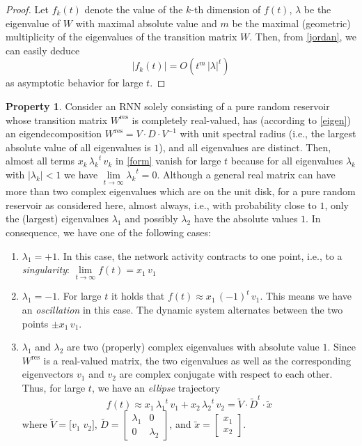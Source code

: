 \documentclass[twoside,11pt]{article}
\theoremstyle{definition}
\newtheorem{prop}{Property}
\begin{document}
\begin{proof}
Let $f_k(t)$ denote the value of the $k$-th dimension of $f(t)$, $\lambda$ be
the eigenvalue of $W$ with maximal absolute value and $m$ be the maximal (geometric)
multiplicity of the eigenvalues of the transition matrix $W$. Then, from
\cref{jordan}, we can easily deduce \[ |f_k(t)| = O(t^m\,|\lambda|^t) \]
as asymptotic behavior for large $t$.
\end{proof}

\begin{prop}\label{infty}
Consider an RNN solely consisting of a pure random reservoir whose transition
matrix $W^\mathrm{res}$ is completely real-valued, has (according to
\cref{eigen}) an eigendecomposition $W^\mathrm{res} = V \cdot D \cdot
V^{-1}$ with unit spectral radius (i.e., the largest absolute value of all
eigenvalues is $1$), and all eigenvalues are distinct. Then, almost all terms $x_k\,{\lambda_k}^t\,v_k$ in
\cref{form} vanish for large $t$ because for all eigenvalues $\lambda_k$
with $|\lambda_k| < 1$ we have $\lim\limits_{t \to \infty} {\lambda_k}^t = 0$.
Although a general real matrix can have more than two complex eigenvalues which
are on the unit disk, for a pure random reservoir as considered here, almost
always, i.e., with probability close to $1$, only the (largest) eigenvalues $\lambda_1$ and possibly
$\lambda_2$ have the absolute values $1$. In consequence, we have one of the
following cases:
\begin{enumerate}
  \item $\lambda_1 = +1$. In this case, the network activity contracts to one
	point, i.e., to a \emph{singularity}: $\lim\limits_{t \to \infty}
	f(t) = x_1\,v_1$
  \item $\lambda_1 = -1$. For large $t$ it holds that $f(t) \approx
	x_1\,(-1)^t\,v_1$. This means we have an \emph{oscillation} in this
	case. The dynamic system alternates between the two points $\pm x_1\,v_1$.
  \item $\lambda_1$ and $\lambda_2$ are two (properly) complex eigenvalues with
	absolute value $1$. Since $W^\mathrm{res}$ is a real-valued matrix, the two
	eigenvalues as well as the corresponding eigenvectors $v_1$ and $v_2$
	are complex conjugate with respect to each other. Thus, for large $t$, we
	have an \emph{ellipse} trajectory
	\[
		f(t) \approx x_1\,{\lambda_1}^t\,v_1 + x_2\,{\lambda_2}^t\,v_2
		= \tilde{V} \cdot \tilde{D}^t \cdot \tilde{x}
	\]
	where $\tilde{V} = \big[ v_1\;v_2 \big]$, $\tilde{D} = \left[
	\begin{array}{cc} \lambda_1 & 0 \\ 0 & \lambda_2 \end{array} \right]$,
	and $\tilde{x} = \left[ \begin{array}{c} x_1 \\ x_2 \end{array}
	\right]$.
\end{enumerate}
\end{prop}
\end{document}
